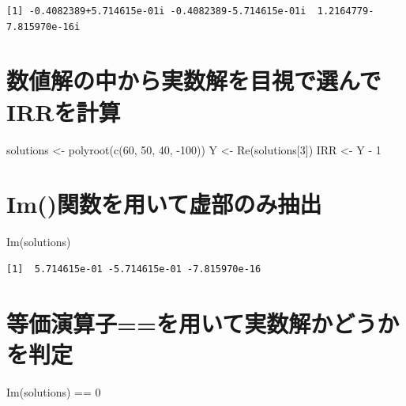 \documentclass[
  letterpaper,
  DIV=11,
  numbers=noendperiod]{scrreprt}
\newenvironment{Shaded}{\begin{snugshade}}{\end{snugshade}}
\newcommand{\DecValTok}[1]{\textcolor[rgb]{0.68,0.00,0.00}{#1}}
\newcommand{\FunctionTok}[1]{\textcolor[rgb]{0.28,0.35,0.67}{#1}}
\newcommand{\NormalTok}[1]{\textcolor[rgb]{0.00,0.23,0.31}{#1}}
\newcommand{\OtherTok}[1]{\textcolor[rgb]{0.00,0.23,0.31}{#1}}
\newcommand{\SpecialCharTok}[1]{\textcolor[rgb]{0.37,0.37,0.37}{#1}}
\begin{document}
\begin{verbatim}
[1] -0.4082389+5.714615e-01i -0.4082389-5.714615e-01i  1.2164779-7.815970e-16i
\end{verbatim}

\section{数値解の中から実数解を目視で選んでIRRを計算}\label{ux6570ux5024ux89e3ux306eux4e2dux304bux3089ux5b9fux6570ux89e3ux3092ux76eeux8996ux3067ux9078ux3093ux3067irrux3092ux8a08ux7b97}

\begin{Shaded}
\begin{Highlighting}[]
\NormalTok{solutions }\OtherTok{\textless{}{-}} \FunctionTok{polyroot}\NormalTok{(}\FunctionTok{c}\NormalTok{(}\DecValTok{60}\NormalTok{, }\DecValTok{50}\NormalTok{, }\DecValTok{40}\NormalTok{, }\SpecialCharTok{{-}}\DecValTok{100}\NormalTok{))}
\NormalTok{Y }\OtherTok{\textless{}{-}} \FunctionTok{Re}\NormalTok{(solutions[}\DecValTok{3}\NormalTok{])}
\NormalTok{IRR }\OtherTok{\textless{}{-}}\NormalTok{ Y }\SpecialCharTok{{-}} \DecValTok{1}
\end{Highlighting}
\end{Shaded}

\section{Im()関数を用いて虚部のみ抽出}\label{imux95a2ux6570ux3092ux7528ux3044ux3066ux865aux90e8ux306eux307fux62bdux51fa}

\begin{Shaded}
\begin{Highlighting}[]
\FunctionTok{Im}\NormalTok{(solutions)}
\end{Highlighting}
\end{Shaded}

\begin{verbatim}
[1]  5.714615e-01 -5.714615e-01 -7.815970e-16
\end{verbatim}

\section{等価演算子==を用いて実数解かどうかを判定}\label{ux7b49ux4fa1ux6f14ux7b97ux5b50ux3092ux7528ux3044ux3066ux5b9fux6570ux89e3ux304bux3069ux3046ux304bux3092ux5224ux5b9a}

\begin{Shaded}
\begin{Highlighting}[]
\FunctionTok{Im}\NormalTok{(solutions) }\SpecialCharTok{==} \DecValTok{0}
\end{Highlighting}
\end{Shaded}
\end{document}
